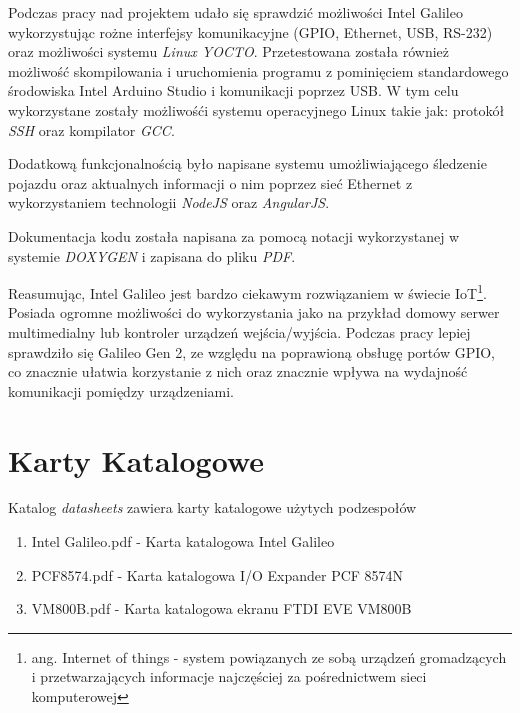 \documentclass{xmgr}
\begin{document}
Podczas pracy nad projektem udało się sprawdzić możliwości Intel Galileo wykorzystując rożne interfejsy komunikacyjne (GPIO, Ethernet, USB, RS-232) oraz możliwości systemu \emph{Linux YOCTO}. Przetestowana została również możliwość skompilowania i uruchomienia programu z pominięciem standardowego środowiska Intel Arduino Studio i komunikacji poprzez USB. W tym celu wykorzystane zostały możliwośći systemu operacyjnego Linux takie jak: protokół \emph{SSH} oraz kompilator \emph{GCC}. 

Dodatkową funkcjonalnością było napisane systemu umożliwiającego śledzenie pojazdu oraz aktualnych informacji o nim poprzez sieć Ethernet z wykorzystaniem technologii \emph{NodeJS} oraz \emph{AngularJS}.

Dokumentacja kodu została napisana za pomocą notacji wykorzystanej w systemie \emph{DOXYGEN} i zapisana do pliku \emph{PDF}.

Reasumując, Intel Galileo jest bardzo ciekawym rozwiązaniem w świecie IoT\footnote{ang. Internet of things - system powiązanych ze sobą urządzeń gromadzących i przetwarzających informacje najczęściej za pośrednictwem sieci komputerowej}. Posiada ogromne możliwości do wykorzystania jako na przykład domowy serwer multimedialny lub kontroler urządzeń wejścia/wyjścia. Podczas pracy lepiej sprawdziło się Galileo Gen 2, ze względu na poprawioną obsługę portów GPIO, co znacznie ułatwia korzystanie z nich oraz znacznie wpływa na wydajność komunikacji pomiędzy urządzeniami.

\appendix
\chapter{Karty Katalogowe}
Katalog \emph{datasheets} zawiera karty katalogowe użytych podzespołów
\begin{enumerate} 
\item Intel Galileo.pdf - Karta katalogowa Intel Galileo
\item PCF8574.pdf - Karta katalogowa I/O Expander PCF 8574N
\item VM800B.pdf - Karta katalogowa ekranu FTDI EVE VM800B
\end{enumerate}
\end{document}
